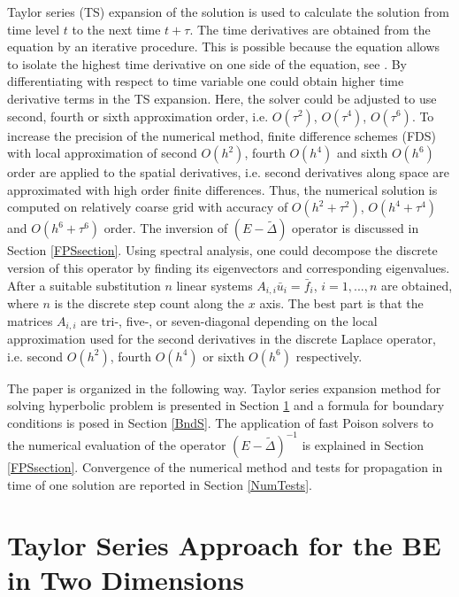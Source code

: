 \documentclass[11pt,a4paper,twoside]{article}
\begin{document}
Taylor series (TS) expansion of the solution is used to calculate the solution from time level $t$ to the next time  $t+\tau$.
The time derivatives
are obtained from the equation  by an iterative procedure. This is possible because the equation allows to isolate the highest time derivative on one side of the equation, see . By differentiating with respect to time variable one could obtain higher time derivative terms in the TS expansion. Here, the solver could be adjusted to use second, fourth or sixth approximation order, i.e. $O(\tau^2)$, $O(\tau^4)$, $O(\tau^6)$. To increase the precision of the numerical method, finite difference schemes (FDS) with local approximation of second $O(h^2)$, fourth $O(h^4)$ and sixth $O(h^6)$ order are  applied to the spatial derivatives, i.e.  second derivatives along space are approximated with high order finite differences. Thus, the numerical solution is computed on relatively coarse grid with  accuracy of $O(h^2+\tau^2)$, $O(h^4+\tau^4)$ and $O(h^6+\tau^6)$ order. The inversion of $(E - \tilde \Delta)$ operator is discussed in Section \ref{FPSsection}. Using spectral analysis, one could decompose the discrete version of this operator by finding its eigenvectors and corresponding eigenvalues. After a suitable substitution $n$ linear systems $A_{i,i} \bar u_i = \bar f_i$, $i = 1,...,n$ are obtained, where $n$ is the discrete step count along the $x$ axis. The best part is that the matrices $A_{i,i}$ are tri-, five-, or seven-diagonal depending on the local approximation used for the second derivatives in the discrete Laplace operator, i.e. second $O(h^2)$,  fourth $O(h^4)$ or sixth $O(h^6)$ respectively. 

The paper is organized in the following way.  Taylor series expansion method for solving hyperbolic problem is presented in Section \ref{TaylorA} and  a formula for boundary conditions is posed in  Section \ref{BndS}. The application of fast Poison solvers to the numerical evaluation of the operator $(E - \tilde \Delta)^{-1}$ is explained in Section \ref{FPSsection}. Convergence of the numerical method and tests for propagation in time of one solution are reported in Section \ref{NumTests}. 

\section{Taylor Series Approach for the BE in Two Dimensions}\label{TaylorA}
\end{document}
